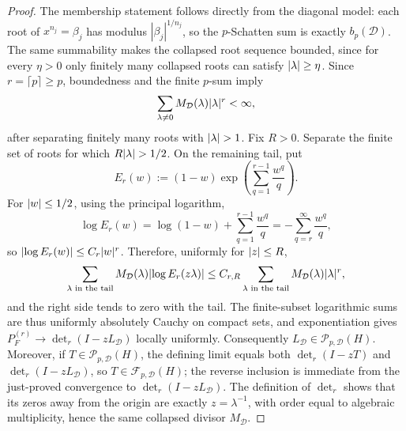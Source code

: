 \begin{proof}
  The membership statement follows directly from the diagonal model: each root
  of \(x^{n_j}=\beta_j\) has modulus \(|\beta_j|^{1/n_j}\), so the
  \(p\)-Schatten sum is exactly \(b_p(\mathcal D)\).  The same summability
  makes the collapsed root sequence bounded, since for every \(\eta>0\) only
  finitely many collapsed roots can satisfy \(\lvert \lambda \rvert\ge\eta\).  Since
  \(r=\lceil p\rceil\ge p\), boundedness and the finite \(p\)-sum imply
  \[
    \sum_{\lambda\ne0}M_{\mathcal D}(\lambda)\lvert \lambda \rvert^{r}<\infty,
  \]
  after separating finitely many roots with \(\lvert \lambda \rvert>1\).  Fix \(R>0\).  Separate the
  finite set of roots for which \(R\lvert \lambda \rvert>1/2\).  On the remaining tail,
  put
  \[
    E_r(w):=(1-w)\exp\!\left(\sum_{q=1}^{r-1}\frac{w^q}{q}\right).
  \]
  For \(\lvert w \rvert\le1/2\), using the principal logarithm,
  \[
    \log E_r(w)
    =\log(1-w)+\sum_{q=1}^{r-1}\frac{w^q}{q}
    =-\sum_{q=r}^{\infty}\frac{w^q}{q},
  \]
  so \(\lvert \log E_r(w) \rvert\le C_r\lvert w \rvert^r\).  Therefore, uniformly for
  \(\lvert z \rvert\le R\),
  \[
    \sum_{\lambda\text{ in the tail}}
    M_{\mathcal D}(\lambda)\lvert \log E_r(z\lambda) \rvert
    \le C_{r,R}
    \sum_{\lambda\text{ in the tail}}
    M_{\mathcal D}(\lambda)\lvert \lambda \rvert^r,
  \]
  and the right side tends to zero with the tail.  The finite-subset
  logarithmic sums are thus uniformly absolutely Cauchy on compact sets, and
  exponentiation gives
  \(P_F^{(r)}\to\det_r(I-zL_{\mathcal D})\) locally uniformly.
  Consequently \(L_{\mathcal D}\in\mathcal P_{p,\mathcal D}(H)\).  Moreover,
  if \(T\in\mathcal P_{p,\mathcal D}(H)\), the defining limit equals both
  \(\det_r(I-zT)\) and \(\det_r(I-zL_{\mathcal D})\), so
  \(T\in\mathcal F_{p,\mathcal D}(H)\); the reverse inclusion is immediate from
  the just-proved convergence to \(\det_r(I-zL_{\mathcal D})\).
  The definition of \(\det_r\) shows that its zeros away from the origin are exactly
  \(z=\lambda^{-1}\), with order equal to algebraic multiplicity, hence the
  same collapsed divisor \(M_{\mathcal D}\).


\end{proof}
